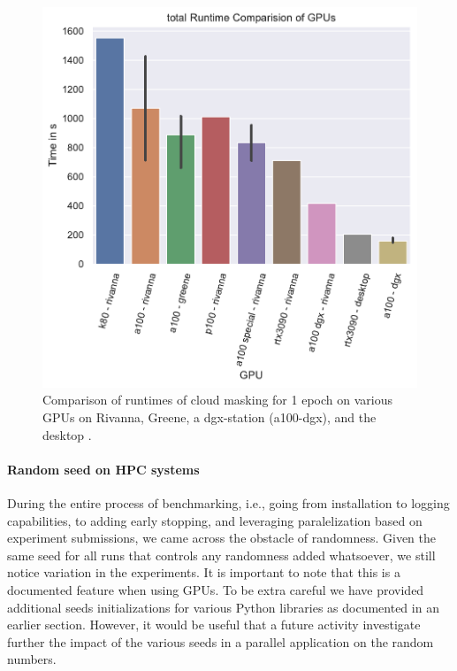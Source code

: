 \documentclass[sigplan,screen]{acmart}
\begin{document}
\begin{figure}[ht]
\centering\includegraphics[width=1.0\columnwidth]{images/gregor-epoch-1.pdf}
\caption{Comparison of runtimes of cloud masking for 1 epoch on various GPUs on Rivanna, Greene, a dgx-station (a100-dgx), and the desktop \cite{las-2023-escience-cloudmask}.}
\label{fig:epoch-compare}
\end{figure}


\paragraph{Random seed on HPC systems} During the entire process of benchmarking, i.e., going from installation to logging capabilities, to adding early stopping, and leveraging paralelization based on experiment submissions, we came across the obstacle of randomness. Given the same seed for all runs that controls any randomness added whatsoever, we still notice variation in the experiments. It is important to note that this is a documented feature when using GPUs. To be extra careful we have provided additional seeds initializations for various Python libraries as documented in an earlier section. However, it would be useful that a future activity investigate further the impact of the various seeds in a parallel application on the random numbers.
\end{document}

